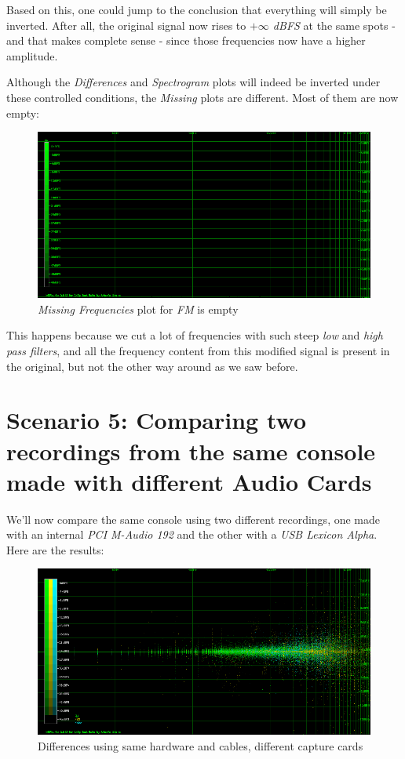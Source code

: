 \documentclass[10pt,a4paper]{report}
\begin{document}
Based on this, one could jump to the conclusion that everything will simply be inverted. After all, the original signal now rises to \textit{$+\infty$ dBFS} at the same spots - and that makes complete sense -  since those frequencies now have a higher amplitude. 

Although the \textit{Differences} and \textit{Spectrogram} plots will indeed be inverted under these controlled conditions, the \textit{Missing} plots are different. Most of them are now empty:

\begin{figure}[H]
	\centering
	\includegraphics[width=1.0\linewidth]{plots/Plot4-8-Missing-FM-Inverted.png}
	\caption[Reversed FM Missing]{\textit{Missing Frequencies} plot for \textit{FM} is empty}
	\label{fig:plot4-8-missing-fm-inverted}
\end{figure}

This happens because we cut a lot of frequencies with such steep \textit{low} and \textit{high pass filters}, and all the frequency content from this modified signal is present in the original, but not the other way around as we saw before.

\section{Scenario 5: Comparing two recordings from the same console made with different Audio Cards}

We'll now compare the same console using two different recordings, one made with an internal \textit{PCI M-Audio 192} and the other with a \textit{USB Lexicon Alpha}. Here are the results:

\begin{figure}[H]
	\centering
	\includegraphics[width=1.0\linewidth]{plots/Plot5-1-All.png}
	\caption[Reversed FM Missing]{Differences using same hardware and cables, different capture cards}
	\label{fig:plot5-1-all}
\end{figure}
\end{document}
